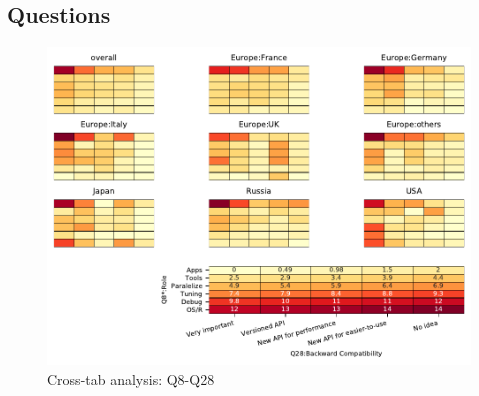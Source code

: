 
\subsection{Questions}


\begin{figure}
\begin{center}
\includegraphics[width=12cm]{../pdfs/Q8-Q28.pdf}
\caption{Cross-tab analysis: Q8-Q28}
\label{fig:Q8-Q28}
\end{center}
\end{figure}
